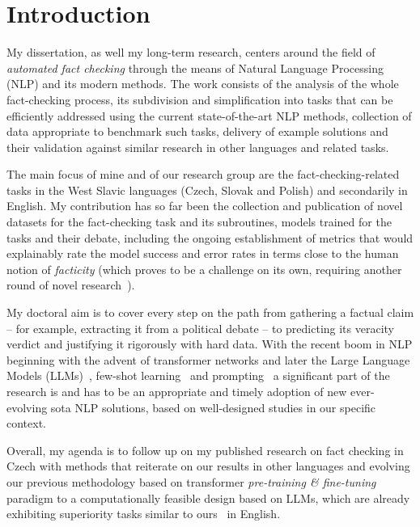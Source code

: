 
\chapter{Introduction}
\label{chap:intro}

My dissertation, as well my long-term research, centers around the field of \textit{automated fact checking} through the means of Natural Language Processing (NLP) and its modern methods.
The work consists of the analysis of the whole fact-checking process, its subdivision and simplification into tasks that can be efficiently addressed using the current state-of-the-art NLP methods, collection of data appropriate to benchmark such tasks, delivery of example solutions and their validation against similar research in other languages and related tasks.

The main focus of mine and of our research group are the fact-checking-related tasks in the West Slavic languages (Czech, Slovak and Polish) and secondarily in English.
My contribution has so far been the collection and publication of novel datasets for the fact-checking task and its subroutines, models trained for the tasks and their debate, including the ongoing establishment of metrics that would explainably rate the model success and error rates in terms close to the human notion of \textit{facticity} (which proves to be a challenge on its own, requiring another round of novel research~\cite{ffci,wright}). 

My doctoral aim is to cover every step on the path from gathering a factual claim -- for example, extracting it from a political debate -- to predicting its veracity verdict and justifying it rigorously with hard data.
With the recent boom in NLP beginning with the advent of transformer networks and later the Large Language Models (LLMs)~\cite{llms}, few-shot learning~\cite{gpt3} and prompting~\cite{prompting} a significant part of the research is and has to be an appropriate and timely adoption of new ever-evolving sota NLP solutions, based on well-designed studies in our specific context.

Overall, my agenda is to follow up on my published research on fact checking in Czech with methods that reiterate on our results in other languages and evolving our previous methodology based on transformer \textit{pre-training \& fine-tuning} paradigm to a computationally feasible design based on LLMs, which are already exhibiting superiority tasks similar to ours~\cite{bing} in English.

